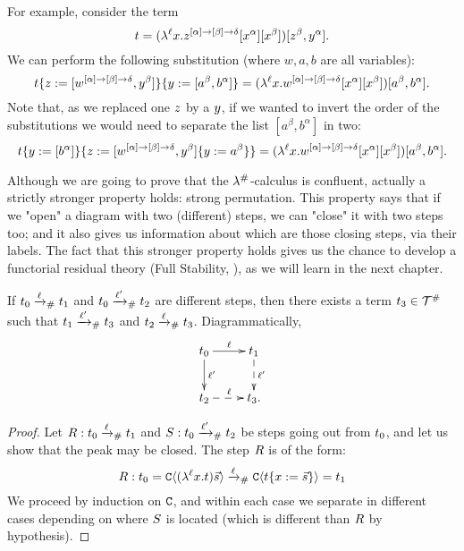 \begin{example} For example, consider the term
\[
  t =
    (\lambda^{\ell} x. z^{[\alpha] \to [\beta] \to \delta} [x^\alpha] [x^\beta])
      [z^\beta,y^\alpha].
\]
We can perform the following substitution (where $w,a,b$ are all variables):
\[
  \subs{
    \subs{\tm}{\varthree}{[w^{[\alpha] \to [\beta] \to \delta}, \vartwo^\beta]}
  }{
    \vartwo
  }{
    [a^\beta,b^\alpha]
  }
  =
   (\lamp{\lab}{\var}{w^{[\alpha] \to [\beta] \to \delta} [\var^\alpha] [\var^\beta]})
    [a^\beta,b^\alpha].
\]
Note that, as we replaced one $z$ by a $y$, if we wanted to invert the order
of the substitutions we would need to separate the list $[a^\beta, b^\alpha]$ in two:
\[
  \subs{
    \subs{\tm}{\vartwo}{[b^\alpha]}
  }{
    \varthree
  }{
    \subs{[w^{[\alpha] \to [\beta] \to \delta}, \vartwo^\beta]}{\vartwo}{a^\beta}
  }
  =
   (\lamp{\lab}{\var}{w^{[\alpha] \to [\beta] \to \delta} [\var^\alpha] [\var^\beta]})
    [a^\beta,b^\alpha].
\]
\end{example}

\bigskip

Although we are going to prove that the $\lambda^{\mathtt{\#}}$-calculus is confluent,
actually a strictly stronger property holds: strong permutation.
This property says that if we "open" a diagram with two (different) steps,
we can "close" it with two steps too; and it also gives us information
about which are those closing steps, via their labels.
The fact that this stronger property holds gives us the chance to
develop a functorial residual theory (\cf Full Stability, ),
as we will learn in the next chapter.



\begin{proposition}
If $t_0 \mathrel{\xrightarrow{\ell}_{\mathtt{\#}}} t_1$
and $t_0 \mathrel{\xrightarrow{\ell'}_{\mathtt{\#}}} t_2$
are different steps, then there exists a term $t_3 \in \mathcal{T}^{\mathtt{\#}}$ such that
$t_1 \mathrel{\xrightarrow{\ell'}_{\mathtt{\#}}} t_3$ and $t_2 \mathrel{\xrightarrow{\ell}_{\mathtt{\#}}} t_3$.
Diagrammatically,
\[
    \xymatrix{
      \tm_0 \ar@{->}[d]^{\lab'}
            \ar@{->}[r]^{\lab} &
      \tm_1 \ar@{-->}[d]^{\lab'} \\
            \ar@{-->}[r]^{\lab}
      \tm_2 &
      \tm_3. \\
    }
\]
\end{proposition}
\begin{proof}
Let $R : t_0 \mathrel{\xrightarrow{\ell}_{\mathtt{\#}}} t_1$ and $S : t_0 \mathrel{\xrightarrow{\ell'}_{\mathtt{\#}}} t_2$
be steps going out from $t_0$, and let us show that the peak may be closed.
The step $R$ is of the form:
\[
  R : t_0 = \mathtt{C}\langle(\lambda^{\ell} x. t)\vec{s}\rangle
           \mathrel{\xrightarrow{\ell}_{\mathtt{\#}}} \mathtt{C}\langle t\{x := \vec{s}\}\rangle = t_1
\]
We proceed by induction on $\mathtt{C}$, and within each case we separate in different
cases depending on where $S$ is located (which is different
than $R$ by hypothesis).
\end{proof}

